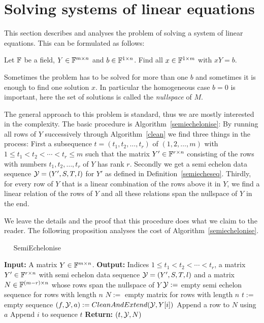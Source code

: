 \section{Solving systems of linear equations}
\label{sec:syslineq}

This section describes and analyses the problem of solving a system
of linear equations. This can be formulated as follows:

Let $\mathbb{F}$ be a field, $Y \in \mathbb{F}^{m \times n}$ and $b \in \mathbb{F}^{1 \times n}$.
Find all $x \in \mathbb{F}^{1 \times m}$ with $xY = b$.

Sometimes the problem has to be solved for more than one $b$ and sometimes
it is enough to find one solution $x$. In particular the homogeneous case 
$b=0$ is important, here the set of solutions is called the \emph{nullspace}
of $M$.

The general approach to this problem is standard, thus we are mostly
interested in the complexity. The basic procedure is
Algorithm~\ref{semiechelonise}: By running
all rows of $Y$ successively through Algorithm~\ref{clean} we
find three things in the process: First a subsequence
$t=(t_1,t_2, \ldots, t_{r})$ of $(1,2,\ldots, m)$ with
$1 \le t_1 < t_2 < \cdots < t_r \le m$ such that the matrix
$Y' \in \mathbb{F}^{r \times n}$ consisting of the rows with numbers 
$t_1, t_2, \ldots, t_r$ of $Y$ has rank $r$. Secondly we get a
semi echelon data sequence $\mathcal{Y} = (Y',S,T,l)$ for $Y'$ as defined
in Definition~\ref{semiecheseq}. Thirdly, for every row of $Y$ that
is a linear combination of the rows above it in $Y$, we find a linear 
relation of the rows of $Y$ and all these relations span the nullspace
of $Y$ in the end.

We leave the details and the proof that this procedure does what
we claim to the reader. The following proposition analyses the cost
of Algorithm~\ref{semiechelonise}.

\begin{algorithm}
\caption{$\quad$ \sc SemiEchelonise}
\label{semiechelonise}
\begin{algorithmic}
\STATE \textbf{Input:} A matrix $Y \in \mathbb{F}^{m \times n}$.
\STATE \textbf{Output:} Indices $1 \le t_1 < t_2 < \cdots < t_r$,
a matrix $Y' \in \mathbb{F}^{r \times n}$ with semi echelon data sequence
\STATE \mbox{}
$\mathcal{Y} = (Y',S,T,l)$ and a matrix $N \in \mathbb{F}^{(m-r) \times n}$
whose rows span the nullspace of $Y$
\STATE $\mathcal{Y} := $ empty semi echelon sequence for rows with length $n$
\STATE $N := $ empty matrix for rows with length $n$
\STATE $t := $ empty sequence
    \STATE $(f,\calY,a) := \textsc{CleanAndExtend}(\calY,Y[i])$
        \STATE Append a row to $N$ using $a$
    \ELSE
        \STATE Append $i$ to sequence $t$
    \ENDIF
\ENDFOR
\STATE \textbf{Return:} $(t,\mathcal{Y},N)$
\end{algorithmic}
\end{algorithm}

